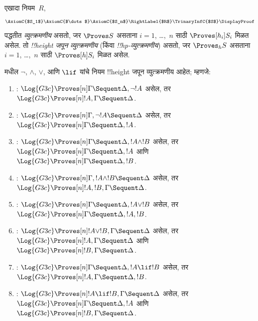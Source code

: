 \documentclass[../../../include/open-logic-section]{subfiles}
\begin{document}


\begin{defn}
एखादा नियम~$R$,
\[
\AxiomC{$S_1$}
\AxiomC{$\dots$}
\AxiomC{$S_n$}
\RightLabel{$R$}
\TrinaryInfC{$S$}
\DisplayProof
\]
पद्धतीत \emph{व्युत्क्रमणीय} असतो, जर $\Proves S$
असताना $i = 1$, \dots,~$n$ साठी $\Proves[h_i] S_i$
मिळत असेल. तो \emph{!!{height} जपून व्युत्क्रमणीय}
(किंवा \emph{!!{hp}-व्युत्क्रमणीय}) असतो, जर
$\Proves_h S$ असताना $i = 1$, \dots,~$n$
साठी $\Proves[h] S_i$ मिळत असेल.
\end{defn}

\begin{lem}
 मधील $\lnot$, $\land$, $\lor$, आणि $\lif$
यांचे नियम !!{height} जपून व्युत्क्रमणीय आहेत;
म्हणजे:
\begin{enumerate}
  \item \RightR{\lnot}: $\Log{G3c} \Proves[n] \Gamma \Sequent
  \Delta, \lnot !A$ असेल, तर $\Log{G3c} \Proves[n] !A, \Gamma \Sequent
  \Delta$.
  \item \LeftR{\lnot}: $\Log{G3c} \Proves[n] \Gamma, \lnot !A
  \Sequent \Delta$ असेल, तर $\Log{G3c} \Proves[n] \Gamma \Sequent \Delta,
  !A$.
  \item \RightR{\land}: $\Log{G3c} \Proves[n] \Gamma \Sequent
  \Delta, !A \land !B$ असेल, तर $\Log{G3c} \Proves[n] \Gamma \Sequent
  \Delta, !A$ आणि $\Log{G3c} \Proves[n] \Gamma \Sequent
  \Delta, !B$.
  \item \LeftR{\land}: $\Log{G3c} \Proves[n] \Gamma, !A \land !B
  \Sequent \Delta$ असेल, तर $\Log{G3c} \Proves[n] !A, !B, \Gamma \Sequent
  \Delta$.
  \item \RightR{\lor}: $\Log{G3c} \Proves[n] \Gamma \Sequent
  \Delta, !A \lor !B$ असेल, तर $\Log{G3c} \Proves[n] \Gamma \Sequent
  \Delta, !A, !B$.
  \item \LeftR{\lor}: $\Log{G3c} \Proves[n] !A \lor !B, \Gamma \Sequent
  \Delta$ असेल, तर $\Log{G3c} \Proves[n] !A, \Gamma \Sequent
  \Delta$ आणि $\Log{G3c} \Proves[n] !B, \Gamma \Sequent
  \Delta$.
  \item \RightR{\lif}: $\Log{G3c} \Proves[n] \Gamma \Sequent
  \Delta, !A \lif !B$ असेल, तर $\Log{G3c} \Proves[n] !A, \Gamma \Sequent
  \Delta, !B$.
  \item \LeftR{\lif}: $\Log{G3c} \Proves[n] !A \lif !B, \Gamma
  \Sequent \Delta$ असेल, तर $\Log{G3c} \Proves[n] \Gamma \Sequent \Delta,
  !A$ आणि $\Log{G3c} \Proves[n] !B, \Gamma \Sequent \Delta$.
\end{enumerate}
\end{lem}
\end{document}
